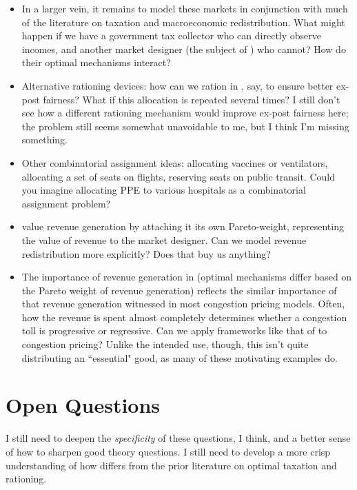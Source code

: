 \documentclass[JEL]{AEA}
\begin{document}
\begin{itemize}    
    \item In a larger vein, it remains to model these markets in conjunction with much of the literature on taxation and macroeconomic redistribution. What might happen if we have a government tax collector who can directly observe incomes, and another market designer (the subject of \cite{akbarpour-2020}) who cannot? How do their optimal mechanisms interact?

    \item Alternative rationing devices: how can we ration in \cite{dworczak-2020}, say, to ensure better ex-post fairness? What if this allocation is repeated several times? I still don't see how a different rationing mechanism would improve ex-post fairness here; the problem still seems somewhat unavoidable to me, but I think I'm missing something.
    
    \item Other combinatorial assignment ideas: allocating vaccines or ventilators, allocating a set of seats on flights, reserving seats on public transit. Could you imagine allocating PPE to various hospitals as a combinatorial assignment problem?
    
    \item \cite{akbarpour-2020} value revenue generation by attaching it its own Pareto-weight, representing the value of revenue to the market designer. Can we model revenue redistribution more explicitly? Does that buy us anything?
    
    \item The importance of revenue generation in \cite{akbarpour-2020} (optimal mechanisms differ based on the Pareto weight of revenue generation) reflects the similar importance of that revenue generation witnessed in most congestion pricing models. Often, how the revenue is spent almost completely determines whether a congestion toll is progressive or regressive. Can we apply frameworks like that of \cite{akbarpour-2020} to congestion pricing? Unlike the intended use, though, this isn't quite distributing an ``essential" good, as many of these motivating examples do.
    
\end{itemize}

\section{Open Questions}

I still need to deepen the \emph{specificity} of these questions, I think, and a better sense of how to sharpen good theory questions. I still need to develop a more crisp understanding of how \cite{dworczak-2020} differs from the prior literature on optimal taxation and rationing.
\end{document}
